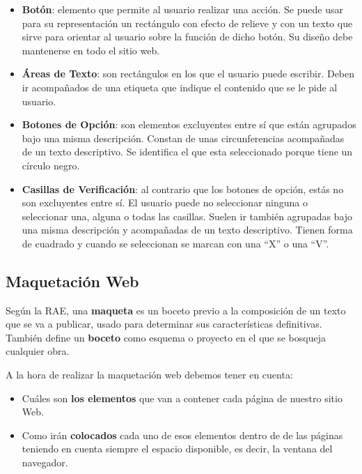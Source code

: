 \begin{itemize}
    \item \textbf{Botón}: elemento que permite al usuario realizar una acción. Se puede usar para su representación un rectángulo con efecto de relieve y con un texto que sirve para orientar al usuario sobre la función de dicho botón. Su diseño debe mantenerse en todo el sitio web.

    \item \textbf{Áreas de Texto}: son rectángulos en los que el usuario puede escribir. Deben ir acompañados de una etiqueta que indique el contenido que se le pide al usuario.

    \item \textbf{Botones de Opción}: son elementos excluyentes entre sí que están agrupados bajo una misma descripción. Constan de unas circunferencias acompañadas de un texto descriptivo. Se identifica el que esta seleccionado porque tiene un círculo negro.

    \item \textbf{Casillas de Verificación}: al contrario que los botones de opción, estás no son excluyentes entre sí. El usuario puede no seleccionar ninguna o seleccionar una, alguna o todas las casillas. Suelen ir también agrupadas bajo una misma descripción y acompañadas de un texto descriptivo. Tienen forma de cuadrado y cuando se seleccionan se marcan con una ``X'' o una ``V''.
\end{itemize}

\subsection{Maquetación Web}
Según la RAE, una \textbf{maqueta} es un boceto previo a la composición de un texto que se va a publicar, usado para determinar sus características definitivas. También define un \textbf{boceto} como esquema o proyecto en el que se bosqueja cualquier obra.

A la hora de realizar la maquetación web debemos tener en cuenta:

\begin{itemize}
    \item Cuáles son \textbf{los elementos} que van a contener cada página de nuestro sitio Web.
    \item Como irán \textbf{colocados} cada uno de esos elementos dentro de de las páginas teniendo en cuenta siempre el espacio disponible, es decir, la ventana del navegador.
\end{itemize}

